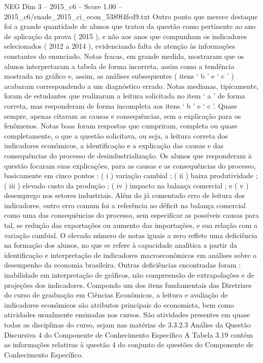 \begin{textsample}{NEG Dim 3 – 2015\_c6 – Score 1.00 – 2015\_c6/enade\_2015\_ci\_econ\_5389f4fcd9.txt}
Outro ponto que merece destaque foi a grande quantidade de alunos que tratou da questão como pertinente ao ano de aplicação da prova ( 2015 ), e não aos anos que compunham os indicadores selecionados ( 2012 a 2014 ), evidenciando falta de atenção às informações constantes do enunciado.
Notas fracas, em grande medida, mostraram que os alunos interpretaram a tabela de forma incorreta, assim como a tendência mostrada no gráfico e, assim, as análises subsequentes ( itens ‘ b ’ e ‘ c ’ ) acabaram correspondendo a um diagnóstico errado.
Notas medianas, tipicamente, foram de estudantes que realizaram a leitura solicitada no item ‘ a ’ de forma correta, mas responderam de forma incompleta aos itens ‘ b ’ e ‘ c ’.
Quase sempre, apenas citavam as causas e consequências, sem a explicação para os fenômenos.
Notas boas foram respostas que cumpriram, completa ou quase completamente, o que a questão solicitava, ou seja, a leitura correta dos indicadores econômicos, a identificação e a explicação das causas e das consequências do processo de desindustrialização.
Os alunos que responderam à questão focaram suas explicações, para as causas e as consequências do processo, basicamente em cinco pontos : ( i ) variação cambial ; ( ii ) baixa produtividade ; ( iii ) elevado custo da produção ; ( iv ) impacto na balança comercial ; e ( v ) desemprego nos setores industriais.
Além do já comentado erro de leitura dos indicadores, outro erro comum foi a referência ao déficit na balança comercial como uma das consequências do processo, sem especificar as possíveis causas para tal, se redução das exportações ou aumento das importações, e sua relação com a variação cambial.
O elevado número de notas iguais a zero reflete uma deficiência na formação dos alunos, no que se refere à capacidade analítica a partir da identificação e interpretação de indicadores macroeconômicos em análises sobre o desempenho da economia brasileira.
Outras deficiências encontradas foram : inabilidade em interpretação de gráficos, não compreensão de extrapolações e de projeções dos indicadores.
Compondo um dos itens fundamentais das Diretrizes do curso de graduação em Ciências Econômicas, a leitura e avaliação de indicadores econômicos são atributos principais do economista, bem como atividades usualmente ensinadas nos cursos.
São atividades presentes em quase todas as disciplinas do curso, sejam nas matérias de 3.3.2.3 Análise da Questão Discursiva 4 do Componente de Conhecimento Específico A Tabela 3.19 contém as informações relativas à questão 4 do conjunto de questões do Componente de Conhecimento Específico.

\end{textsample}

